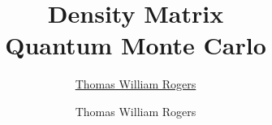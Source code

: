 \documentclass[oneside,12pt]{Classes/CUEDthesisPSnPDF}
\title{Density Matrix \\[1ex]
Quantum Monte Carlo}
\author{\href{mailto:thomas.rogers08@imperial.ac.uk}{Thomas William Rogers}}
\author{Thomas William Rogers}
\begin{document}

%   






\maketitle

\setcounter{secnumdepth}{3}
\setcounter{tocdepth}{3}

\frontmatter %

%


\makeatletter
{}
\makeatother
\listoffigures

\mainmatter %






\backmatter %
\begin{singlespace}
\begin{footnotesize}

%
%
\renewcommand{\bibname}{References} %
\end{footnotesize}
\end{singlespace}

\appendix



\end{document}
